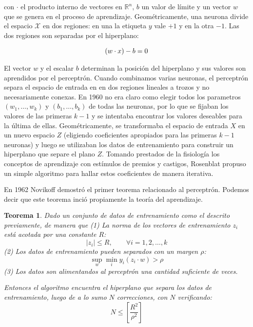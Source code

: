 \documentclass{report}
\newtheorem{thm}{Teorema}[subsection]
\begin{document}
con \(\cdot\) el producto interno de vectores en \(\mathbb{R}^n\), \(b\) un valor de límite y un vector \(w\) que se genera en el proceso de aprendizaje. Geométricamente, una 
neurona divide el espacio \(\mathcal{X}\) en dos regiones: en una la etiqueta \(y\) vale \(+1\) y en la otra \(-1\). Las dos regiones son separadas por el hiperplano:\newline

\[
(w\cdot x) - b = 0 \newline
\]

El vector \(w\) y el escalar \(b\) determinan la posición del hiperplano y sus valores son aprendidos por el perceptrón. Cuando combinamos varias neuronas, el perceptrón
separa el espacio de entrada en en dos regiones lineales a trozos y no necesariamente conexas. En 1960 no era claro como elegir todos los parametros \((w_1,\dots,w_k)\) y
\((b_1,\dots, b_k)\) de todas las neuronas, por lo que se fijaban los valores de las primeras \(k-1\) y se intentaba encontrar los valores deseables para la última
de ellas. Geométricamente, se transformaba el espacio de entrada $X$ en un nuevo espacio $Z$ (eligiendo coeficientes apropiados para las primeras $k-1$ neuronas) y luego
se utilizaban los datos de entrenamiento para construir un hiperplano que separe el plano $Z$. Tomando prestados de la fisiología los conceptos de aprendizaje con estímulos de premios y castigos, Rosenblat propuso un simple algoritmo para hallar estos 
coeficientes de manera iterativa.\newline


En 1962 Novikoff demostró el primer teorema relacionado al perceptrón. Podemos decir que este teorema inció propiamente la teoría del aprendizaje.

\begin{thm}
Dado un conjunto de datos de entrenamiento como el descrito previamente, de manera que\newline
(1) La norma de los vectores de entrenamiento $z_i$ está acotada por una constante $R$:
\[
|z_i| \leq R, \qquad \forall i=1,2,\dots,k
\]
(2) Los datos de entrenamiento pueden separados con un margen $\rho$:
\[
\sup_{w} \min_{i} y_i(z_i\cdot w) > \rho
\]
(3) Los datos son alimentandos al perceptrón una cantidad \textit{suficiente} de veces.

Entonces el algoritmo encuentra el hiperplano que separa los datos de entrenamiento, luego de a lo
sumo $N$ correcciones, con $N$ verificando:
\[
N \leq \left [ \frac{R^2}{\rho^2}\right ]
\]

\end{thm}
\end{document}
